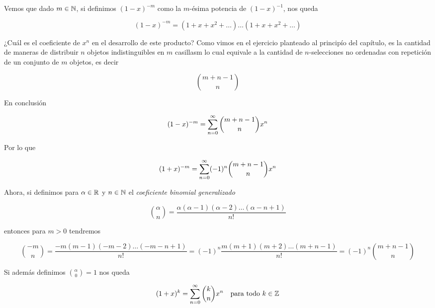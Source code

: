 Vemos que dado $m \in \mathbb{N}$, si definimos $(1-x)^{-m}$ como la $m$-ésima potencia de $(1-x)^{-1}$, nos queda

\[
(1-x)^{-m} = (1+x+x^2+\dots)\dots(1+x+x^2+\dots)
\]

\begin{pre}
    ¿Cuál es el coeficiente de $x^n$ en el desarrollo de este producto? Como vimos en el ejercicio planteado al principío del capítulo, es la cantidad de maneras de distribuir $n$ objetos indistinguibles en $m$ casillasm lo cual equivale a la cantidad de $n$-selecciones no ordenadas con repetición de un conjunto de $m$ objetos, es decir
    
    \[
    \binom{m+n-1}{n}
    \]
    
    En conclusión
    
    \[
    (1-x)^{-m} = \sum_{n=0}^{\infty} \binom{m+n-1}{n}x^n
    \]
    
    Por lo que
    
    \[
    (1+x)^{-m} = \sum_{n=0}^{\infty} (-1)^n\binom{m+n-1}{n}x^n
    \]
\end{pre}

Ahora, si definimos para $\alpha \in \mathbb{R}$ y $n \in \mathbb{N}$ el \textit{coeficiente binomial generalizado}

\[
\binom{\alpha}{n} = \frac{\alpha(\alpha - 1)(\alpha - 2)\dots(\alpha - n + 1)}{n!}
\]

\noindent entonces para $m > 0$ tendremos

\[
\binom{-m}{n} = \frac{-m(m-1)(-m-2)\dots(-m-n+1)}{n!} = (-1)^n\frac{m(m+1)(m+2)\dots(m+n-1)}{n!} = (-1)^n\binom{m+n-1}{n}
\]

Si además definimos $\displaystyle \binom{\alpha}{0} = 1$ nos queda

\[
(1+x)^k = \sum_{n=0}^{\infty} \binom{k}{n}x^n \quad \text{para todo $k \in \mathbb{Z}$}
\]